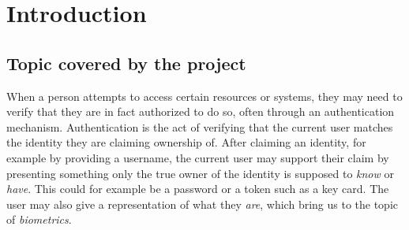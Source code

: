 \documentclass[informationsecurity]{gucmasterproject}
\begin{document}
%
%

\chapter{Introduction}

\section{Topic covered by the project}
\label{sec:topic}
When a person attempts to access certain resources or systems, they may need to verify that they are in fact authorized to do so, often through an authentication mechanism.
Authentication is the act of verifying that the current user matches the identity they are claiming ownership of.
After claiming an identity, for example by providing a username, the current user may support their claim by presenting something only the true owner of the identity is supposed to \textit{know} or \textit{have}.
This could for example be a password or a token such as a key card.
The user may also give a representation of what they \textit{are}, which bring us to the topic of \textit{biometrics}.
\end{document}
